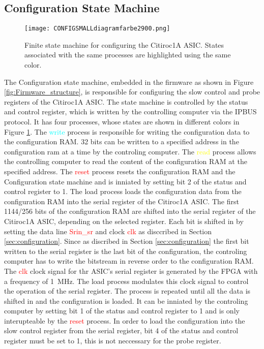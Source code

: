 \subsection{Configuration State Machine}
\begin{figure}[H]
    \centering
    \texttt{[image: CONFIGSMALLdiagramfarbe2900.png]}%
    \caption{Finite state machine for configuring the Citiroc1A ASIC.
    States associated with the same processes are highlighted using the same color.}
    \label{fig:Configuration_state_machine}
\end{figure}
The Configuration state machine, embedded  in the firmware as shown in Figure \ref{fig:Firmware_structure}, is responsible for configuring the slow control and probe registers of the Citiroc1A ASIC.
The state machine is controlled by the status and control register, which is written by the controlling computer via the IPBUS protocol.
It has four processes, whose states are shown in different colors in Figure \ref{fig:Configuration_state_machine}.
\newline
The \textcolor{cyan}{write} process is responsible for writing the configuration data to the configuration RAM.
32 bits can be written to a specified address in the configuration ram at a time by the controling computer.
\newline
The \textcolor{yellow}{read} process allows the controlling computer to read the content of the configuration RAM at the specified address.
\newline
The \textcolor{red}{reset} process resets the configuration RAM and the Configuration state machine and is inniated by setting bit 2 of the status and control register to 1.
\newline
The \textcolor{VioletRed}{load} process loads the configuration data from the configuration RAM into the serial register of the Citiroc1A ASIC. 
The first 1144/256 bits of the configuration RAM are shifted into the serial register of the Citiroc1A ASIC, depending on the selected register.
Each bit is shifted in by setting the data line \textcolor{red}{Srin\_sr} and clock \textcolor{red}{clk} as disccribed in Section \ref{sec:configuration}.
Since as discribed in Section \ref{sec:configuration} the first bit written to the serial register is the last bit of the configuration, the controling computer has to write the bitstream in reverse order to the configuration RAM.
\newline
The \textcolor{red}{clk} clock signal for thr ASIC's serial register is generated by the FPGA with a frequency of \SI{1}{\mega\hertz}.
The \textcolor{VioletRed}{load} process modulates this clock signal to control the operation of the serial register.
\newline
The process is repeated until all the data is shifted in and the configuration is loaded.
It can be inniated by the controling computer by setting bit 1 of the status and control register to 1 and is only interupteable by the \textcolor{red}{reset} process.
\newline
In order to load the configuration into the slow control register from the serial register, bit 4 of the status and control register must be set to 1, this is not neccessary for the probe register.

